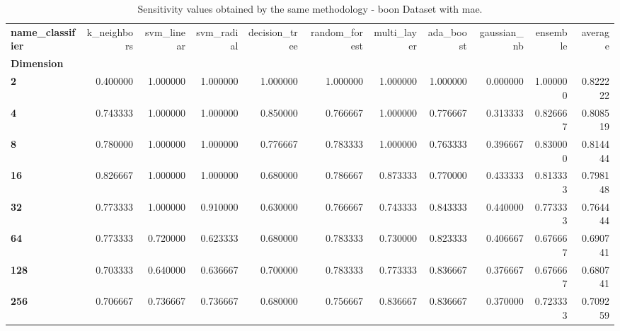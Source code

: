 \begin{table}
\centering
\caption{Sensitivity values obtained by the same methodology - boon Dataset with mae.}
\label{sensitivity_boon_mae-reproduction}
\begin{tabular}{lrrrrrrrrrr}
\toprule
\textbf{name\_classifier} &  k\_neighbors &  svm\_linear &  svm\_radial &  decision\_tree &  random\_forest &  multi\_layer &  ada\_boost &  gaussian\_nb &  ensemble &   average \\
\textbf{Dimension} &              &             &             &                &                &              &            &              &           &           \\
\midrule
\textbf{2        } &     0.400000 &    1.000000 &    1.000000 &       1.000000 &       1.000000 &     1.000000 &   1.000000 &     0.000000 &  1.000000 &  0.822222 \\
\textbf{4        } &     0.743333 &    1.000000 &    1.000000 &       0.850000 &       0.766667 &     1.000000 &   0.776667 &     0.313333 &  0.826667 &  0.808519 \\
\textbf{8        } &     0.780000 &    1.000000 &    1.000000 &       0.776667 &       0.783333 &     1.000000 &   0.763333 &     0.396667 &  0.830000 &  0.814444 \\
\textbf{16       } &     0.826667 &    1.000000 &    1.000000 &       0.680000 &       0.786667 &     0.873333 &   0.770000 &     0.433333 &  0.813333 &  0.798148 \\
\textbf{32       } &     0.773333 &    1.000000 &    0.910000 &       0.630000 &       0.766667 &     0.743333 &   0.843333 &     0.440000 &  0.773333 &  0.764444 \\
\textbf{64       } &     0.773333 &    0.720000 &    0.623333 &       0.680000 &       0.783333 &     0.730000 &   0.823333 &     0.406667 &  0.676667 &  0.690741 \\
\textbf{128      } &     0.703333 &    0.640000 &    0.636667 &       0.700000 &       0.783333 &     0.773333 &   0.836667 &     0.376667 &  0.676667 &  0.680741 \\
\textbf{256      } &     0.706667 &    0.736667 &    0.736667 &       0.680000 &       0.756667 &     0.836667 &   0.836667 &     0.370000 &  0.723333 &  0.709259 \\
\bottomrule
\end{tabular}
\end{table}
